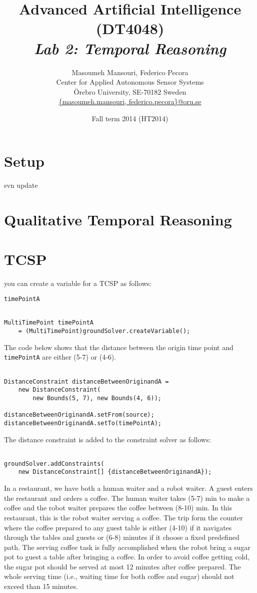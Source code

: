 \documentclass[a4paper]{article}
\title{Advanced Artificial Intelligence (DT4048)\\{\em Lab 2: Temporal Reasoning}}
\author{Masoumeh Mansouri, Federico Pecora\\Center for Applied Autonomous Sensor Systems\\\"Orebro University, SE-70182 Sweden\\\url{{masoumeh.mansouri, federico.pecora}@oru.se}}
\date{Fall term 2014 (HT2014)}
\begin{document}
\maketitle

\section{Setup}

svn update

\section{Qualitative Temporal Reasoning}

\section{TCSP}
you can create a variable for a TCSP as follows:

{\tt timePointA} 

\begin{lstlisting}

MultiTimePoint timePointA 
	= (MultiTimePoint)groundSolver.createVariable();

\end{lstlisting}

\noindent The code below shows that the distance between the origin time point and {\tt timePointA} are either (5-7) or (4-6).

\begin{lstlisting}

DistanceConstraint distanceBetweenOriginandA = 
	new DistanceConstraint(
		new Bounds(5, 7), new Bounds(4, 6));

distanceBetweenOriginandA.setFrom(source);
distanceBetweenOriginandA.setTo(timePointA);

\end{lstlisting}

\noindent The distance constraint is added to the constraint solver as follows:

\begin{lstlisting}

groundSolver.addConstraints(
	new DistanceConstraint[] {distanceBetweenOriginandA});
\end{lstlisting}



In a restaurant, we have both a human waiter and a robot waiter. A guest enters the restaurant and orders a coffee. The human waiter takes (5-7) min to make a coffee and the robot waiter prepares the coffee between (8-10) min. In this restaurant, this is the robot waiter serving a coffee. The trip form the counter where the coffee prepared to any guest table is either (4-10) if it navigates through the tables and guests or (6-8) minutes if it choose a fixed predefined path. The serving coffee task is fully accomplished when the robot bring a sugar pot to guest a table after bringing a coffee. In order to avoid coffee getting cold, the sugar pot should be served at most 12 minutes after coffee prepared. The whole serving time (i.e., waiting time for both coffee and sugar) should not exceed than 15 minutes. 
\end{document}
